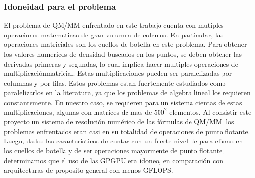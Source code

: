 \subsubsection{Idoneidad para el problema}
El problema de QM/MM enfrentado en este trabajo cuenta con mutiples operaciones matematicas de gran
volumen de calculos. En particular, las operaciones matriciales son los cuellos de botella en este
problema.
Para obtener los valores numericos de densidad buscados en los puntos, se deben obtener las derivadas primeras
y segundas, lo cual implica hacer multiples operaciones de multiplicaci\'onmatricial. Estas multiplicaciones
pueden ser paralelizadas por columnas y por filas. Estos problemas estan fuertemente estudiados como paralelizarlos
en la literatura, ya que los problemas de algebra lineal los requieren constantemente.
En nuestro caso, se requieren para un sistema cientas de estas multiplicaciones, algunas con matrices de mas de
$500^2$ elementos. Al consistir este proyecto un sistema de resoluci\'on num\'erico de las f\'ormulas de QM/MM,
los problemas enfrentados eran casi en su totalidad de operaciones de punto flotante. Luego, dados las
caracteristicas de contar con un fuerte nivel de paralelismo en los cuellos de botella y de ser operaciones
mayormente de punto flotante, determinamos que el uso de las GPGPU era idoneo, en comparaci\'on con arquitecturas
de proposito general con menos GFLOPS.

